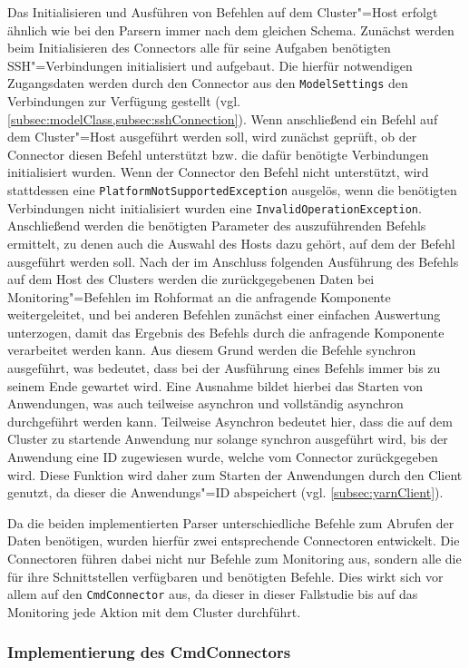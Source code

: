Das Initialisieren und Ausführen von Befehlen auf dem Cluster"=Host erfolgt ähnlich wie bei den Parsern immer nach dem gleichen Schema.
Zunächst werden beim Initialisieren des Connectors alle für seine Aufgaben benötigten SSH"=Verbindungen initialisiert und aufgebaut.
Die hierfür notwendigen Zugangsdaten werden durch den Connector aus den \texttt{ModelSettings} den Verbindungen zur Verfügung gestellt (vgl. \cref{subsec:modelClass,subsec:sshConnection}).
Wenn anschließend ein Befehl auf dem Cluster"=Host ausgeführt werden soll, wird zunächst geprüft, ob der Connector diesen Befehl unterstützt bzw. die dafür benötigte Verbindungen initialisiert wurden.
Wenn der Connector den Befehl nicht unterstützt, wird stattdessen eine \texttt{PlatformNotSupportedException} ausgelös, wenn die benötigten Verbindungen nicht initialisiert wurden eine \texttt{InvalidOperationException}.
Anschließend werden die benötigten Parameter des auszuführenden Befehls ermittelt, zu denen auch die Auswahl des Hosts dazu gehört, auf dem der Befehl ausgeführt werden soll.
Nach der im Anschluss folgenden Ausführung des Befehls auf dem Host des Clusters werden die zurückgegebenen Daten bei Monitoring"=Befehlen im Rohformat an die anfragende Komponente weitergeleitet, und bei anderen Befehlen zunächst einer einfachen Auswertung unterzogen, damit das Ergebnis des Befehls durch die anfragende Komponente verarbeitet werden kann.
Aus diesem Grund werden die Befehle synchron ausgeführt, was bedeutet, dass bei der Ausführung eines Befehls immer bis zu seinem Ende gewartet wird.
Eine Ausnahme bildet hierbei das Starten von Anwendungen, was auch teilweise asynchron und vollständig asynchron durchgeführt werden kann.
Teilweise Asynchron bedeutet hier, dass die auf dem Cluster zu startende Anwendung nur solange synchron ausgeführt wird, bis der Anwendung eine ID zugewiesen wurde, welche vom Connector zurückgegeben wird.
Diese Funktion wird daher zum Starten der Anwendungen durch den Client genutzt, da dieser die Anwendungs"=ID abspeichert (vgl. \cref{subsec:yarnClient}).

Da die beiden implementierten Parser unterschiedliche Befehle zum Abrufen der Daten benötigen, wurden hierfür zwei entsprechende Connectoren entwickelt.
Die Connectoren führen dabei nicht nur Befehle zum Monitoring aus, sondern alle die für ihre Schnittstellen verfügbaren und benötigten Befehle.
Dies wirkt sich vor allem auf den \texttt{CmdConnector} aus, da dieser in dieser Fallstudie bis auf das Monitoring jede Aktion mit dem Cluster durchführt.

\subsubsection{Implementierung des CmdConnectors}
\label{subsubsec:implCmdConnector}

